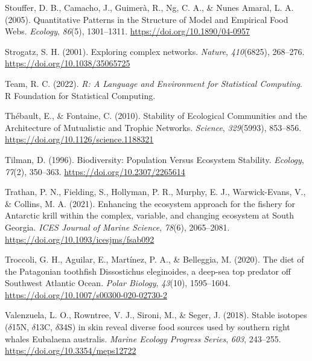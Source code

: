 \documentclass[preprint, 3p,
authoryear]{elsarticle} %
\newlength{\cslhangindent}
\newlength{\cslentryspacingunit} %
\newenvironment{CSLReferences}[2] %
 {%
  \setlength{\parindent}{0pt}
  \ifodd #1
  \let\oldpar\par
  \def\par{\hangindent=\cslhangindent\oldpar}
  \fi
  \setlength{\parskip}{#2\cslentryspacingunit}
 }%
 {}
\begin{document}
\begin{CSLReferences}{1}{0}
\leavevmode{}%
Stouffer, D. B., Camacho, J., Guimerà, R., Ng, C. A., \& Nunes Amaral,
L. A. (2005). Quantitative {Patterns} in the {Structure} of {Model} and
{Empirical Food Webs}. \emph{Ecology}, \emph{86}(5), 1301--1311.
\url{https://doi.org/10.1890/04-0957}

\leavevmode{}%
Strogatz, S. H. (2001). Exploring complex networks. \emph{Nature},
\emph{410}(6825), 268--276. \url{https://doi.org/10.1038/35065725}

\leavevmode{}%
Team, R. C. (2022). \emph{R: {A Language} and {Environment} for
{Statistical Computing}}. R Foundation for Statistical Computing.

\leavevmode{}%
Thébault, E., \& Fontaine, C. (2010). Stability of {Ecological
Communities} and the {Architecture} of {Mutualistic} and {Trophic
Networks}. \emph{Science}, \emph{329}(5993), 853--856.
\url{https://doi.org/10.1126/science.1188321}

\leavevmode{}%
Tilman, D. (1996). Biodiversity: {Population Versus Ecosystem
Stability}. \emph{Ecology}, \emph{77}(2), 350--363.
\url{https://doi.org/10.2307/2265614}

\leavevmode{}%
Trathan, P. N., Fielding, S., Hollyman, P. R., Murphy, E. J.,
Warwick-Evans, V., \& Collins, M. A. (2021). Enhancing the ecosystem
approach for the fishery for {Antarctic} krill within the complex,
variable, and changing ecosystem at {South Georgia}. \emph{ICES Journal
of Marine Science}, \emph{78}(6), 2065--2081.
\url{https://doi.org/10.1093/icesjms/fsab092}

\leavevmode{}%
Troccoli, G. H., Aguilar, E., Martínez, P. A., \& Belleggia, M. (2020).
The diet of the {Patagonian} toothfish {Dissostichus} eleginoides, a
deep-sea top predator off {Southwest Atlantic Ocean}. \emph{Polar
Biology}, \emph{43}(10), 1595--1604.
\url{https://doi.org/10.1007/s00300-020-02730-2}

\leavevmode{}%
Valenzuela, L. O., Rowntree, V. J., Sironi, M., \& Seger, J. (2018).
Stable isotopes ({\(\delta\)15N}, {\(\delta\)13C}, {\(\delta\)34S}) in
skin reveal diverse food sources used by southern right whales
{Eubalaena} australis. \emph{Marine Ecology Progress Series},
\emph{603}, 243--255. \url{https://doi.org/10.3354/meps12722}


\end{CSLReferences}
\end{document}
